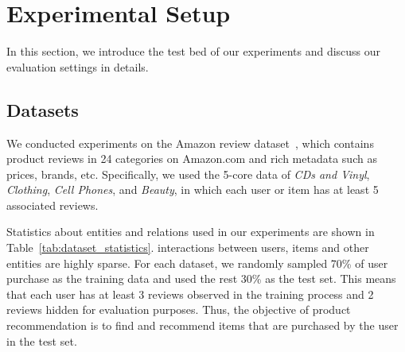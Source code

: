 \documentclass[algorithms,article,accept,moreauthors,pdftex,10pt,a4paper]{Definitions/mdpi}
\begin{document}
\section{Experimental Setup}\label{sec:setup}


In this section, we introduce the test bed of our experiments and discuss our evaluation settings in details.

\subsection{Datasets}
We conducted experiments on the Amazon review dataset~\cite{mcauley2015image}, which contains product reviews in 24 categories on Amazon.com and rich metadata such as prices, brands, etc.
Specifically, we used the 5-core data of \textit{CDs and Vinyl}, \textit{Clothing}, \textit{Cell Phones}, and \textit{Beauty}, in which each user or item has at least 5 associated reviews.


Statistics about entities and relations used in our experiments are shown in Table~\ref{tab:dataset_statistics}. 
 interactions between users, items and other entities are highly sparse.
For each dataset, we randomly sampled 70\% of user purchase as the training data and used the rest 30\% as the test set. 
This means that each user has at least 3 reviews observed in the training process and 2 reviews hidden for evaluation purposes.
Thus, the objective of product recommendation is to find and recommend items that are purchased by the user in the test set.
\end{document}
